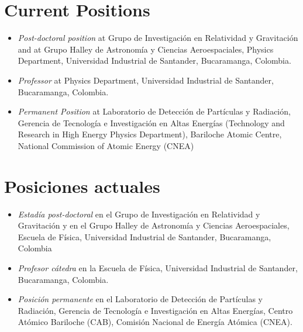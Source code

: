 \ifeng
\section*{Current Positions}
\begin{itemize}
\item \emph{Post-doctoral position} at Grupo de Investigación en Relatividad y Gravitación and at Grupo Halley de Astronomía y Ciencias Aeroespaciales, Physics Department, Universidad Industrial de Santander, Bucaramanga, Colombia.
\item \emph{Professor} at Physics Department, Universidad Industrial de Santander, Bucaramanga, Colombia.
\item \emph{Permanent Position} at Laboratorio de Detección de Partículas y Radiación, Gerencia de Tecnología e Investigación en Altas Energías (Technology and Research in High Energy Physics Department), Bariloche Atomic Centre, National Commission of Atomic Energy (CNEA)
\end{itemize}
\else
\section*{Posiciones actuales}
\begin{itemize}
\item \emph{Estadía post-doctoral} en el Grupo de Investigación en Relatividad y Gravitación y en el Grupo Halley de Astronomía y Ciencias Aeroespaciales, Escuela de Física, Universidad Industrial de Santander, Bucaramanga, Colombia
\item \emph{Profesor cátedra} en la Escuela de Física, Universidad Industrial de Santander, Bucaramanga, Colombia.
\item \emph{Posición permanente} en el Laboratorio de Detección de Partículas y Radiación, Gerencia de Tecnología e Investigación en Altas Energías, Centro Atómico Bariloche (CAB), Comisión Nacional de Energía Atómica (CNEA).\\
\end{itemize}
\fi

\ifeng
